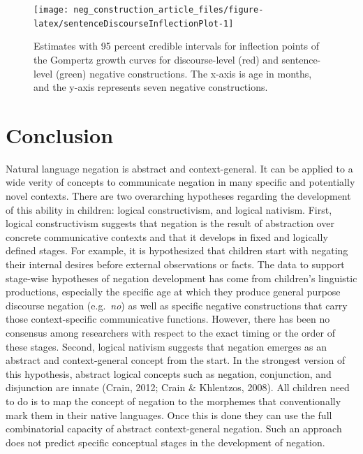 \documentclass[
  man,floatsintext]{apa6}
\begin{document}
\begin{figure}[H]

{\centering \texttt{[image: neg\_construction\_article\_files/figure-latex/sentenceDiscourseInflectionPlot-1]} 

}

\caption{Estimates with 95 percent credible intervals for inflection points of the Gompertz growth curves for discourse-level (red) and sentence-level (green) negative constructions. The x-axis is age in months, and the y-axis represents seven negative constructions.}\label{fig:sentenceDiscourseInflectionPlot}
\end{figure}

\hypertarget{conclusion}{%
\section{Conclusion}\label{conclusion}}

Natural language negation is abstract and context-general. It can be applied to a wide verity of concepts to communicate negation in many specific and potentially novel contexts. There are two overarching hypotheses regarding the development of this ability in children: logical constructivism, and logical nativism. First, logical constructivism suggests that negation is the result of abstraction over concrete communicative contexts and that it develops in fixed and logically defined stages. For example, it is hypothesized that children start with negating their internal desires before external observations or facts. The data to support stage-wise hypotheses of negation development has come from children's linguistic productions, especially the specific age at which they produce general purpose discourse negation (e.g.~\emph{no}) as well as specific negative constructions that carry those context-specific communicative functions. However, there has been no consensus among researchers with respect to the exact timing or the order of these stages. Second, logical nativism suggests that negation emerges as an abstract and context-general concept from the start. In the strongest version of this hypothesis, abstract logical concepts such as negation, conjunction, and disjunction are innate (Crain, 2012; Crain \& Khlentzos, 2008). All children need to do is to map the concept of negation to the morphemes that conventionally mark them in their native languages. Once this is done they can use the full combinatorial capacity of abstract context-general negation. Such an approach does not predict specific conceptual stages in the development of negation.
\end{document}
